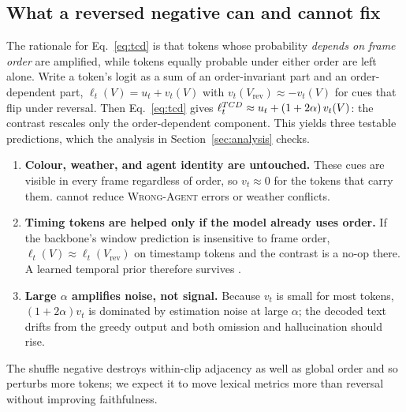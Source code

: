 \subsection{What a reversed negative can and cannot fix}
\label{sec:mechanism}
The rationale for Eq.~\eqref{eq:tcd} is that tokens whose probability \emph{depends on frame order} are amplified, while tokens equally probable under either order are left alone.
Write a token's logit as a sum of an order-invariant part and an order-dependent part, $\ell_t(V)=u_t+v_t(V)$ with $v_t(V_{\mathrm{rev}})\approx-v_t(V)$ for cues that flip under reversal.
Then Eq.~\eqref{eq:tcd} gives $\ell_t^{TCD}\approx u_t+(1+2\alpha)\,v_t(V)$: the contrast rescales only the order-dependent component.
This yields three testable predictions, which the analysis in Section~\ref{sec:analysis} checks.

\begin{enumerate}[label=\textbf{P\arabic*}]
  \item \textbf{Colour, weather, and agent identity are untouched.}
  These cues are visible in every frame regardless of order, so $v_t{\approx}0$ for the tokens that carry them.
  \tcd{} cannot reduce \textsc{Wrong-Agent} errors or weather conflicts.
  \item \textbf{Timing tokens are helped only if the model already uses order.}
  If the backbone's window prediction is insensitive to frame order, $\ell_t(V)\approx\ell_t(V_{\mathrm{rev}})$ on timestamp tokens and the contrast is a no-op there.
  A learned temporal prior therefore survives \tcd.
  \item \textbf{Large $\alpha$ amplifies noise, not signal.}
  Because $v_t$ is small for most tokens, $(1+2\alpha)v_t$ is dominated by estimation noise at large $\alpha$; the decoded text drifts from the greedy output and both omission and hallucination should rise.
\end{enumerate}
The shuffle negative destroys within-clip adjacency as well as global order and so perturbs more tokens; we expect it to move lexical metrics more than reversal without improving faithfulness.
